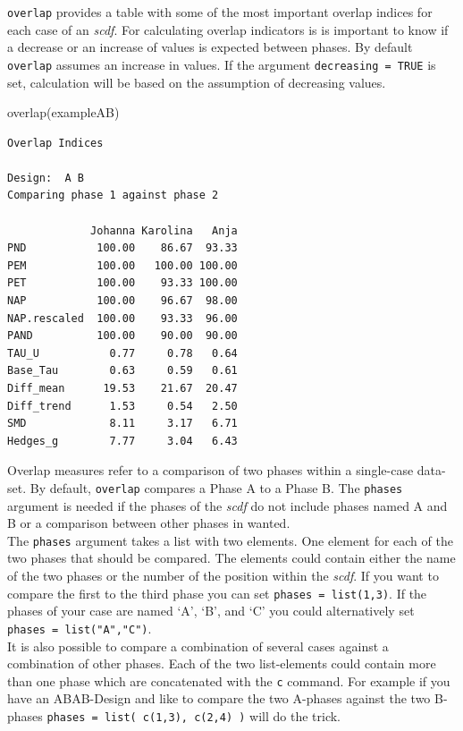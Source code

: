 \documentclass[
]{book}
\newenvironment{Shaded}{\begin{snugshade}}{\end{snugshade}}
\newcommand{\FunctionTok}[1]{\textcolor[rgb]{0.00,0.00,0.00}{#1}}
\newcommand{\NormalTok}[1]{#1}
\begin{document}
\texttt{overlap} provides a table with some of the most important overlap indices for each case of an \emph{scdf}. For calculating overlap indicators is is important to know if a decrease or an increase of values is expected between phases. By default \texttt{overlap} assumes an increase in values. If the argument \texttt{decreasing\ =\ TRUE} is set, calculation will be based on the assumption of decreasing values.

\begin{Shaded}
\begin{Highlighting}[]
\FunctionTok{overlap}\NormalTok{(exampleAB)}
\end{Highlighting}
\end{Shaded}

\begin{verbatim}
Overlap Indices

Design:  A B 
Comparing phase 1 against phase 2 

             Johanna Karolina   Anja
PND           100.00    86.67  93.33
PEM           100.00   100.00 100.00
PET           100.00    93.33 100.00
NAP           100.00    96.67  98.00
NAP.rescaled  100.00    93.33  96.00
PAND          100.00    90.00  90.00
TAU_U           0.77     0.78   0.64
Base_Tau        0.63     0.59   0.61
Diff_mean      19.53    21.67  20.47
Diff_trend      1.53     0.54   2.50
SMD             8.11     3.17   6.71
Hedges_g        7.77     3.04   6.43
\end{verbatim}

Overlap measures refer to a comparison of two phases within a single-case data-set. By default, \texttt{overlap} compares a Phase A to a Phase B. The \texttt{phases} argument is needed if the phases of the \emph{scdf} do not include phases named A and B or a comparison between other phases in wanted.\\
The \texttt{phases} argument takes a list with two elements. One element for each of the two phases that should be compared. The elements could contain either the name of the two phases or the number of the position within the \emph{scdf}. If you want to compare the first to the third phase you can set \texttt{phases\ =\ list(1,3)}. If the phases of your case are named `A', `B', and `C' you could alternatively set \texttt{phases\ =\ list("A","C")}.\\
It is also possible to compare a combination of several cases against a combination of other phases. Each of the two list-elements could contain more than one phase which are concatenated with the \texttt{c} command. For example if you have an ABAB-Design and like to compare the two A-phases against the two B-phases \texttt{phases\ =\ list(\ c(1,3),\ c(2,4)\ )} will do the trick.
\end{document}
